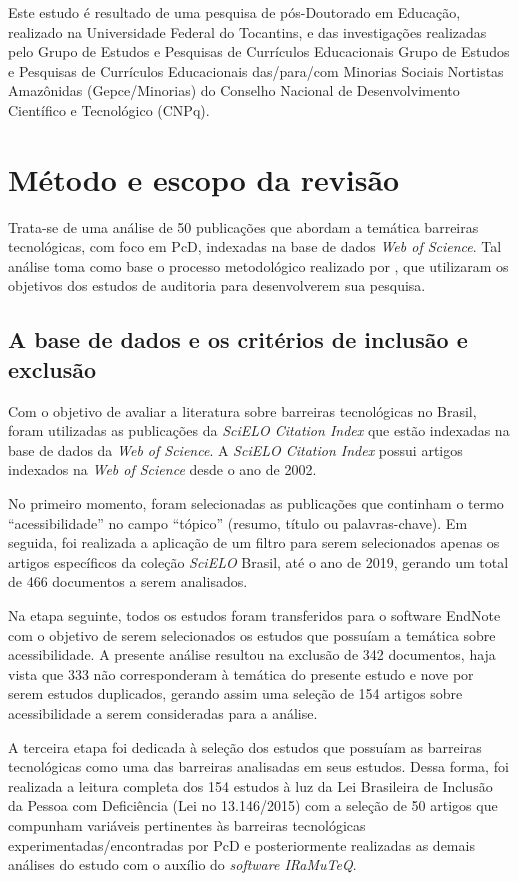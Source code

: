 \documentclass{textolivre}
\begin{document}
Este estudo é resultado de uma pesquisa de pós-Doutorado em Educação, realizado na Universidade Federal do Tocantins, e das investigações realizadas pelo Grupo de Estudos e Pesquisas de Currículos Educacionais Grupo de Estudos e Pesquisas de Currículos Educacionais das/para/com Minorias Sociais Nortistas Amazônidas (Gepce/Minorias) do Conselho Nacional de Desenvolvimento Científico e Tecnológico (CNPq).

\section{Método e escopo da revisão}
Trata-se de uma análise de 50 publicações que abordam a temática barreiras tecnológicas, com foco em PcD, indexadas na base de dados \emph{Web of Science}. Tal análise toma como base o processo metodológico realizado por \textcite{porte2018}, que utilizaram os objetivos dos estudos de auditoria para desenvolverem sua pesquisa.

\subsection{A base de dados e os critérios de inclusão e exclusão}
Com o objetivo de avaliar a literatura sobre barreiras tecnológicas no Brasil, foram utilizadas as publicações da \emph{SciELO Citation Index} que estão indexadas na base de dados da \emph{Web of Science}. A \emph{SciELO Citation Index} possui artigos indexados na \emph{Web of Science} desde o ano de 2002.

No primeiro momento, foram selecionadas as publicações que continham o termo “acessibilidade” no campo “tópico” (resumo, título ou palavras-chave). Em seguida, foi realizada a aplicação de um filtro para serem selecionados apenas os artigos específicos da coleção \emph{SciELO} Brasil, até o ano de 2019, gerando um total de 466 documentos a serem analisados.

Na etapa seguinte, todos os estudos foram transferidos para o software EndNote com o objetivo de serem selecionados os estudos que possuíam a temática sobre acessibilidade. A presente análise resultou na exclusão de 342 documentos, haja vista que 333 não corresponderam à temática do presente estudo e nove por serem estudos duplicados, gerando assim uma seleção de 154 artigos sobre acessibilidade a serem consideradas para a análise.

A terceira etapa foi dedicada à seleção dos estudos que possuíam as barreiras tecnológicas como uma das barreiras analisadas em seus estudos. Dessa forma, foi realizada a leitura completa dos 154 estudos à luz da Lei Brasileira de Inclusão da Pessoa com Deficiência (Lei no 13.146/2015) \cite{brasil_lei_2015} com a seleção de 50 artigos que compunham variáveis pertinentes às barreiras tecnológicas experimentadas/encontradas por PcD e posteriormente realizadas as demais análises do estudo com o auxílio do \emph{software IRaMuTeQ}.
\end{document}
